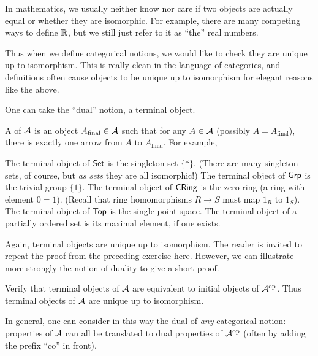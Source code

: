 \begin{remark}
	In mathematics, we usually neither know nor care if two objects are actually equal
	or whether they are isomorphic.
	For example, there are many competing ways to define $\RR$,
	but we still just refer to it as ``the'' real numbers.

	Thus when we define categorical notions, we would like to check they are
	unique up to isomorphism.
	This is really clean in the language of categories, and definitions
	often cause objects to be unique up to isomorphism for elegant reasons like the above.
\end{remark}

One can take the ``dual'' notion, a terminal object.
\begin{example}
	A  of $\AA$ is an object
	$A_{\text{final}} \in \AA$ such that for any $A \in \AA$ (possibly $A = A_{\text{final}}$),
	there is exactly one arrow from $A$ to $A_{\text{final}}$.
	For example,
	\begin{enumerate}[(a)]
		\ii The terminal object of $\catname{Set}$ is the singleton set $\{\ast\}$.
		(There are many singleton sets, of course, but \emph{as sets} they are all isomorphic!)
		\ii The terminal object of $\catname{Grp}$ is the trivial group $\{1\}$.
		\ii The terminal object of $\catname{CRing}$ is the zero ring (a ring with element $0=1$).
		(Recall that ring homomorphisms $R \to S$ must map $1_R$ to $1_S$).
		\ii The terminal object of $\catname{Top}$ is the single-point space.
		\ii The terminal object of a partially ordered set is its maximal element, if one exists.
	\end{enumerate}
\end{example}

Again, terminal objects are unique up to isomorphism.
The reader is invited to repeat the proof from the preceding exercise here.
However, we can illustrate more strongly the notion of duality to give a short proof.
\begin{ques}
	Verify that terminal objects of $\AA$ are equivalent to initial objects of $\AA\op$.
	Thus terminal objects of $\AA$ are unique up to isomorphism.
\end{ques}
In general, one can consider in this way the dual of \emph{any} categorical notion:
properties of $\AA$ can all be translated to dual properties of $\AA\op$
(often by adding the prefix ``co'' in front).

